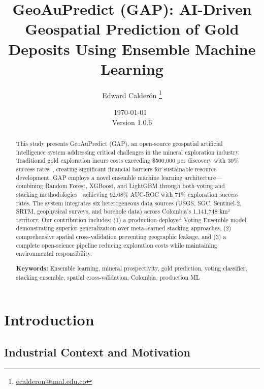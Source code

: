 \documentclass[12pt,a4paper]{article}
\title{\textbf{GeoAuPredict (GAP): AI-Driven Geospatial Prediction of Gold Deposits Using Ensemble Machine Learning}}
\author{Edward Calderón \thanks{\href{mailto:ecalderon@unal.edu.co}{ecalderon@unal.edu.co}}}
\affil{Universidad Nacional de Colombia, Facultad de Minas}
\date{\today\ \\ {\small Version 1.0.6}}
\begin{document}
\maketitle

\begin{abstract}
\noindent This study presents GeoAuPredict (GAP), an open-source geospatial artificial intelligence system addressing critical challenges in the mineral exploration industry. Traditional gold exploration incurs costs exceeding \$500,000 per discovery with 30\% success rates~\citep{colombian_gold}, creating significant financial barriers for sustainable resource development. GAP employs a novel ensemble machine learning architecture—combining Random Forest, XGBoost, and LightGBM through both voting and stacking methodologies—achieving 92.08\% AUC-ROC with 71\% exploration success rates. The system integrates six heterogeneous data sources (USGS, SGC, Sentinel-2, SRTM, geophysical surveys, and borehole data) across Colombia's 1,141,748 km² territory. Our contribution includes: (1) a production-deployed Voting Ensemble model demonstrating superior generalization over meta-learned stacking approaches, (2) comprehensive spatial cross-validation preventing geographic leakage, and (3) a complete open-science pipeline reducing exploration costs while maintaining environmental responsibility.

\vspace{0.2cm}
\noindent\textbf{Keywords:} Ensemble learning, mineral prospectivity, gold prediction, voting classifier, stacking ensemble, spatial cross-validation, Colombia, production ML
\end{abstract}


\vspace{0.3cm}
\noindent{}
\vspace{0.3cm}

\newpage

\section{Introduction}

\subsection{Industrial Context and Motivation}
\end{document}
